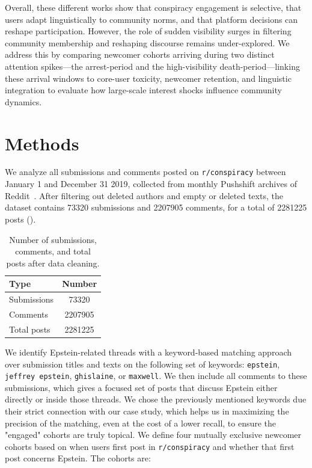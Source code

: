 \documentclass[letterpaper]{article} %
\begin{document}
Overall, these different works show that conspiracy engagement is selective, that users adapt linguistically to community norms, and that platform decisions can reshape participation. 
However, the role of sudden visibility surges in filtering community membership and reshaping discourse remains under-explored.
We address this by comparing newcomer cohorts arriving during two distinct attention spikes—the arrest-period and the high-visibility death-period—linking these arrival windows to core-user toxicity, newcomer retention, and linguistic integration to evaluate how large-scale interest shocks influence community dynamics.

\section{Methods}
We analyze all submissions and comments posted on \texttt{r/conspiracy} between January 1 and December 31 2019, collected from monthly Pushshift archives of Reddit~\citep{baumgartner_pushshift_2020}. 
After filtering out deleted authors and empty or deleted texts, the dataset contains \num{73320} submissions and \num{2207905} comments, for a total of \num{2281225} posts (). 

\begin{table}[b]
    \label{table:dataset-sizes}
    \begin{center}
        \begin{tabular}{lS[table-number-alignment=center,table-format=7.0]}
        \toprule
        \textbf{Type} & \textbf{Number} \\
        \midrule
        Submissions & 73320 \\
        Comments & 2207905 \\
        \midrule
        Total posts & 2281225 \\
        \bottomrule
    \end{tabular}
    \end{center}
    \caption{Number of submissions, comments, and total posts after data cleaning.}
\end{table}

We identify Epstein-related threads with a keyword-based matching approach over submission titles and texts on the following set of keywords: \texttt{epstein}, \texttt{jeffrey epstein}, \texttt{ghislaine}, or \texttt{maxwell}. 
We then include all comments to these submissions, which gives a focused set of posts that discuss Epstein either directly or inside those threads.
We chose the previously mentioned keywords due their strict connection with our case study, which helps us in maximizing the precision of the matching, even at the cost of a lower recall, to ensure the "engaged" cohorts are truly topical.
We define four mutually exclusive newcomer cohorts based on when users first post in \texttt{r/conspiracy} and whether that first post concerns Epstein. 
The cohorts are:
\end{document}
